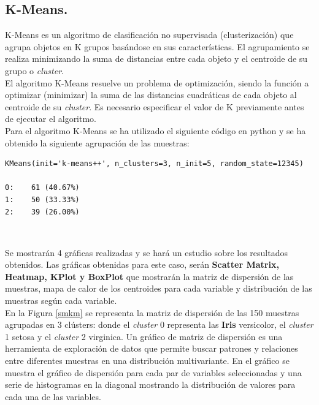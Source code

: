 \documentclass[a4paper, 20pt]{article}
\begin{document}
\clearpage

\subsection{K-Means.}

K-Means es un algoritmo de clasificación no supervisada (clusterización) que agrupa objetos en K grupos basándose en sus características. El agrupamiento se realiza minimizando la suma de distancias entre cada objeto y el centroide de su grupo o \textit{cluster}.\\ 

El algoritmo K-Means resuelve un problema de optimización, siendo la función a optimizar (minimizar) la suma de las distancias cuadráticas de cada objeto al centroide de su \textit{cluster}. Es necesario especificar el valor de K previamente antes de ejecutar el algoritmo.\\

Para el algoritmo K-Means se ha utilizado el siguiente código en python y se ha obtenido la siguiente agrupación de las muestras:\\

\begin{lstlisting}
KMeans(init='k-means++', n_clusters=3, n_init=5, random_state=12345)

0:    61 (40.67%)
1:    50 (33.33%)
2:    39 (26.00%)
\end{lstlisting}\

Se mostrarán 4 gráficas realizadas y se hará un estudio sobre los resultados obtenidos. Las gráficas obtenidas para este caso, serán \textbf{Scatter Matrix, Heatmap, KPlot y BoxPlot} que mostrarán la matriz de dispersión de las muestras, mapa de calor de los centroides para cada variable y distribución de las muestras según cada variable.\\

En la Figura \ref{smkm} se representa la matriz de dispersión de las 150 muestras agrupadas en 3 clústers: donde el \textit{cluster} 0 representa las \textbf{Iris} versicolor, el \textit{cluster} 1 setosa y el \textit{cluster} 2 virginica. Un gráfico de matriz de dispersión es una herramienta de exploración de datos que permite buscar patrones y relaciones entre diferentes muestras en una distribución multivariante. En el gráfico se muestra el gráfico de dispersión para cada par de variables seleccionadas y una serie de histogramas en la diagonal mostrando la distribución de valores para cada una de las variables.\\
\end{document}
